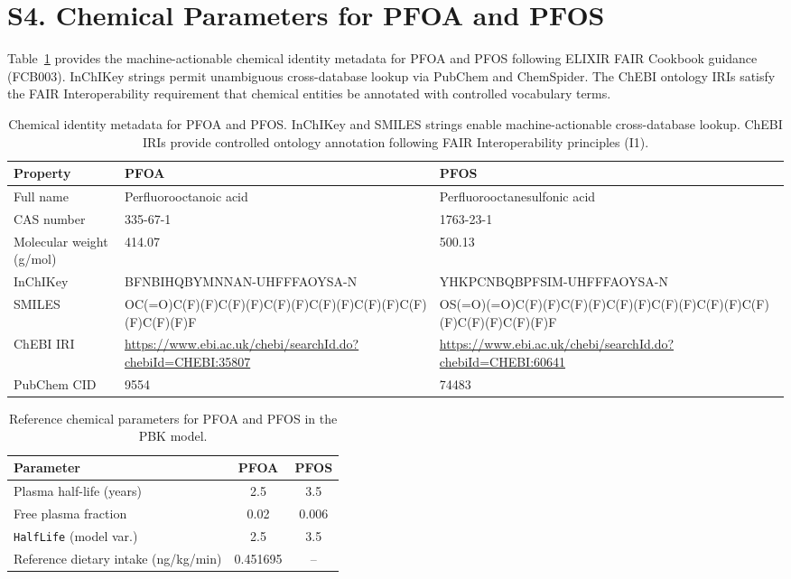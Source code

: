 \documentclass[12pt]{article}
\begin{document}
\section*{S4. Chemical Parameters for PFOA and PFOS}

Table~\ref{tab:chem_identity} provides the machine-actionable chemical identity metadata for PFOA and PFOS following ELIXIR FAIR Cookbook guidance (FCB003). InChIKey strings permit unambiguous cross-database lookup via PubChem and ChemSpider. The ChEBI ontology IRIs satisfy the FAIR Interoperability requirement that chemical entities be annotated with controlled vocabulary terms.

\begin{table}[h]
\centering
\caption{Chemical identity metadata for PFOA and PFOS. InChIKey and SMILES strings enable machine-actionable cross-database lookup. ChEBI IRIs provide controlled ontology annotation following FAIR Interoperability principles (I1).}
\label{tab:chem_identity}
\begin{tabular}{p{3.5cm} p{5cm} p{5cm}}
\toprule
\textbf{Property} & \textbf{PFOA} & \textbf{PFOS} \\
\midrule
Full name & Perfluorooctanoic acid & Perfluorooctanesulfonic acid \\
CAS number & 335-67-1 & 1763-23-1 \\
Molecular weight (g/mol) & 414.07 & 500.13 \\
InChIKey & BFNBIHQBYMNNAN-UHFFFAOYSA-N & YHKPCNBQBPFSIM-UHFFFAOYSA-N \\
SMILES & OC(=O)C(F)(F)C(F)(F)C(F)(F)C(F)(F)C(F)(F)C(F)(F)C(F)(F)F & OS(=O)(=O)C(F)(F)C(F)(F)C(F)(F)C(F)(F)C(F)(F)C(F)(F)C(F)(F)C(F)(F)F \\
ChEBI IRI & \url{https://www.ebi.ac.uk/chebi/searchId.do?chebiId=CHEBI:35807} & \url{https://www.ebi.ac.uk/chebi/searchId.do?chebiId=CHEBI:60641} \\
PubChem CID & 9554 & 74483 \\
\bottomrule
\end{tabular}
\end{table}
\begin{table}[h]
\centering
\caption{Reference chemical parameters for PFOA and PFOS in the
PBK model.}
\label{tab:chem_params}
\begin{tabular}{lcc}
\toprule
\textbf{Parameter} & \textbf{PFOA} & \textbf{PFOS} \\
\midrule
Plasma half-life (years)       & 2.5  & 3.5   \\
Free plasma fraction           & 0.02 & 0.006 \\
\texttt{HalfLife} (model var.) & 2.5  & 3.5   \\
Reference dietary intake (ng/kg/min) & 0.451695 & -- \\
\bottomrule
\end{tabular}
\end{table}
\end{document}
